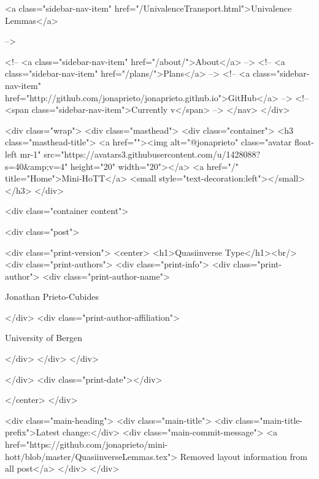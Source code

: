       
    
      
        
          <a class="sidebar-nav-item" href="/UnivalenceTransport.html">Univalence Lemmas</a>
        
      
     -->

    <!-- <a class="sidebar-nav-item" href="/about/">About</a> -->
    <!-- <a class="sidebar-nav-item" href="/plans/">Plans</a> -->
    <!-- <a class="sidebar-nav-item" href="http://github.com/jonaprieto/jonaprieto.github.io">GitHub</a> -->
    <!-- <span class="sidebar-nav-item">Currently v</span> -->
  </nav>
</div>

    <div class="wrap">
      <div class="masthead">
        <div class="container">
          <h3 class="masthead-title">
            <a href=""><img alt="@jonaprieto" class="avatar float-left mr-1" src="https://avatars3.githubusercontent.com/u/1428088?s=40&amp;v=4" height="20" width="20"></a>
            <a href="/" title="Home">Mini-HoTT</a>
            <small style="text-decoration:left"></small>
          </h3>
        </div>
      
      <div class="container content">
        







<div class="post">

  <div class="print-version">
    <center>
      <h1>Quasiinverse Type</h1><br/>
        <div class="print-authors">
          <div class="print-info">
            <div class="print-author">
              <div class="print-author-name">
                
                  Jonathan Prieto-Cubides
                
              </div>
              <div class="print-author-affiliation">
                
                  University of Bergen
                
                </div>
            </div>
          </div>
          
          
        </div>
        <div class="print-date"></div>
        
        
    </center>
  </div>

  
  <div class="main-heading">
    <div class="main-title">
      <div class="main-title-prefix">Latest change:</div>
      <div class="main-commit-message">
            <a href="https://github.com/jonaprieto/mini-hott/blob/master/QuasiinverseLemmas.tex">
              Removed layout information from all post</a>
      </div>
    </div>

